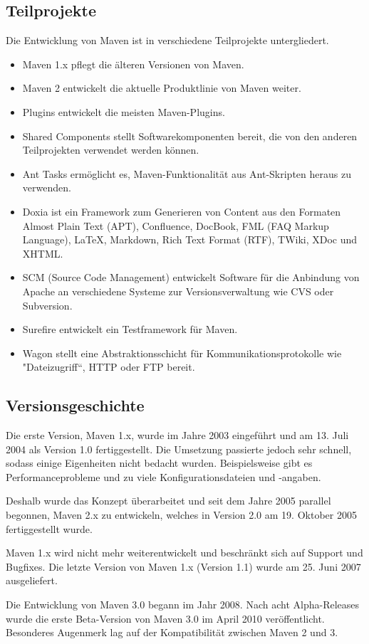 \documentclass{article}
\begin{document}
\subsection{Teilprojekte}
Die Entwicklung von Maven ist in verschiedene Teilprojekte untergliedert.
\begin{itemize}
\item Maven 1.x pflegt die älteren Versionen von Maven.
\item Maven 2 entwickelt die aktuelle Produktlinie von Maven weiter.
\item Plugins entwickelt die meisten Maven-Plugins.
\item Shared Components stellt Softwarekomponenten bereit, die von den anderen Teilprojekten verwendet werden können.
\item Ant Tasks ermöglicht es, Maven-Funktionalität aus Ant-Skripten heraus zu verwenden.
\item Doxia ist ein Framework zum Generieren von Content aus den Formaten Almost Plain Text (APT), Confluence, DocBook, FML (FAQ Markup Language), LaTeX, Markdown, Rich Text Format (RTF), TWiki, XDoc und XHTML.
\item SCM (Source Code Management) entwickelt Software für die Anbindung von Apache an verschiedene Systeme zur Versionsverwaltung wie CVS oder Subversion.
\item Surefire entwickelt ein Testframework für Maven.
\item Wagon stellt eine Abstraktionsschicht für Kommunikationsprotokolle wie "Dateizugriff“, HTTP oder FTP bereit.
\end{itemize}

\subsection{Versionsgeschichte}
Die erste Version, Maven 1.x, wurde im Jahre 2003 eingeführt und am 13. Juli 2004 als Version 1.0 fertiggestellt. Die Umsetzung passierte jedoch sehr schnell, sodass einige Eigenheiten nicht bedacht wurden. Beispielsweise gibt es Performanceprobleme und zu viele Konfigurationsdateien und -angaben.

Deshalb wurde das Konzept überarbeitet und seit dem Jahre 2005 parallel begonnen, Maven 2.x zu entwickeln, welches in Version 2.0 am 19. Oktober 2005 fertiggestellt wurde.

Maven 1.x wird nicht mehr weiterentwickelt und beschränkt sich auf Support und Bugfixes. Die letzte Version von Maven 1.x (Version 1.1) wurde am 25. Juni 2007 ausgeliefert.

Die Entwicklung von Maven 3.0 begann im Jahr 2008. Nach acht Alpha-Releases wurde die erste Beta-Version von Maven 3.0 im April 2010 veröffentlicht. Besonderes Augenmerk lag auf der Kompatibilität zwischen Maven 2 und 3.
\end{document}
